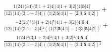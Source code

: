 \documentclass[varwidth, border=5pt]{standalone}
\begin{document}
\begin{my}
$\begin{gathered}
\scriptscriptstyle\frac{1⟨24⟩⟨34⟩⟨3|1+2|4]⟨4|1+3|2]⟨4|𝟓|4]}{⟨12⟩⟨14⟩⟨2|1+3|4](⟨1|2|𝟓|4|1]-⟨2|3|𝟓|4|2])} +\\
\scriptscriptstyle\frac{-2⟨24⟩²⟨3|1+2|4]²⟨4|1+3|2]⟨4|𝟓|4]}{⟨12⟩⟨14⟩⟨2|1+3|4]²(⟨1|2|𝟓|4|1]-⟨2|3|𝟓|4|2])} +\\
\scriptscriptstyle\frac{1⟨24⟩²⟨3|1+2|4]²⟨4|1+3|2]²⟨4|𝟓|4]}{⟨12⟩⟨14⟩⟨2|1+3|4](⟨1|2|𝟓|4|1]-⟨2|3|𝟓|4|2])²} \phantom{+}
\end{gathered}$
\end{my}
\end{document}
